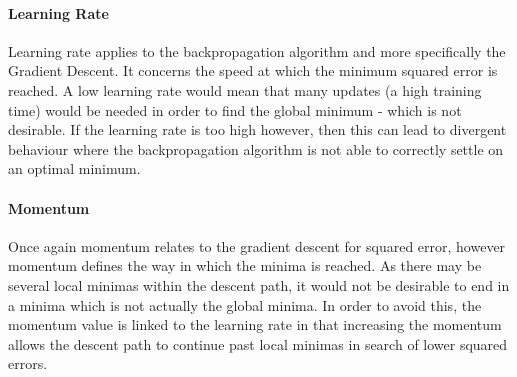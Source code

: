 \documentclass[12pt]{article}
\begin{document}
        \paragraph{Learning Rate}
          Learning rate applies to the backpropagation algorithm and more specifically the Gradient Descent. It concerns the speed at which the minimum squared error is reached. A low learning rate would mean that many updates (a high training time) would be needed in order to find the global minimum - which is not desirable. If the learning rate is too high however, then this can lead to divergent behaviour where the backpropagation algorithm is not able to correctly settle on an optimal minimum.



        \paragraph{Momentum}
          Once again momentum relates to the gradient descent for squared error, however momentum defines the way in which the minima is reached. As there may be several local minimas within the descent path, it would not be desirable to end in a minima which is not actually the global minima. In order to avoid this, the momentum value is linked to the learning rate in that increasing the momentum allows the descent path to continue past local minimas in search of lower squared errors.
\end{document}
